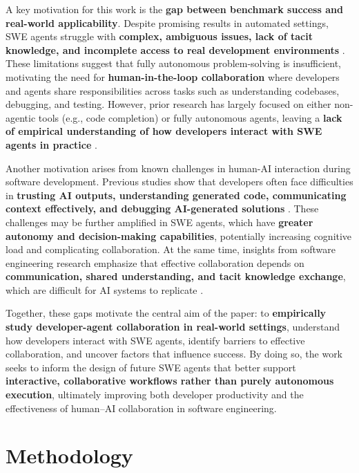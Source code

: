 A key motivation for this work is the \textbf{gap between benchmark success and real-world applicability}. Despite promising results in automated settings, SWE agents struggle with \textbf{complex, ambiguous issues, lack of tacit knowledge, and incomplete access to real development environments} \cite{miserendino2024swelancer, rus2002knowledge}.  These limitations suggest that fully autonomous problem-solving is insufficient, motivating the need for \textbf{human-in-the-loop collaboration} where developers and agents share responsibilities across tasks such as understanding codebases, debugging, and testing.  However, prior research has largely focused on either non-agentic tools (e.g., code completion) or fully autonomous agents, leaving a \textbf{lack of empirical understanding of how developers interact with SWE agents in practice} \cite{liu2024llmagents}.

Another motivation arises from known challenges in human-AI interaction during software development. Previous studies show that developers often face difficulties in \textbf{trusting AI outputs, understanding generated code, communicating context effectively, and debugging AI-generated solutions} \cite{barke2023groundedcopilot, vaithilingam2022expectation}.  These challenges may be further amplified in SWE agents, which have \textbf{greater autonomy and decision-making capabilities}, potentially increasing cognitive load and complicating collaboration.  At the same time, insights from software engineering research emphasize that effective collaboration depends on \textbf{communication, shared understanding, and tacit knowledge exchange}, which are difficult for AI systems to replicate \cite{rus2002knowledge, goncalves2011collaboration}.

Together, these gaps motivate the central aim of the paper: to \textbf{empirically study developer-agent collaboration in real-world settings}, understand how developers interact with SWE agents, identify barriers to effective collaboration, and uncover factors that influence success.  By doing so, the work seeks to inform the design of future SWE agents that better support \textbf{interactive, collaborative workflows rather than purely autonomous execution}, ultimately improving both developer productivity and the effectiveness of human–AI collaboration in software engineering.

\section{Methodology}
